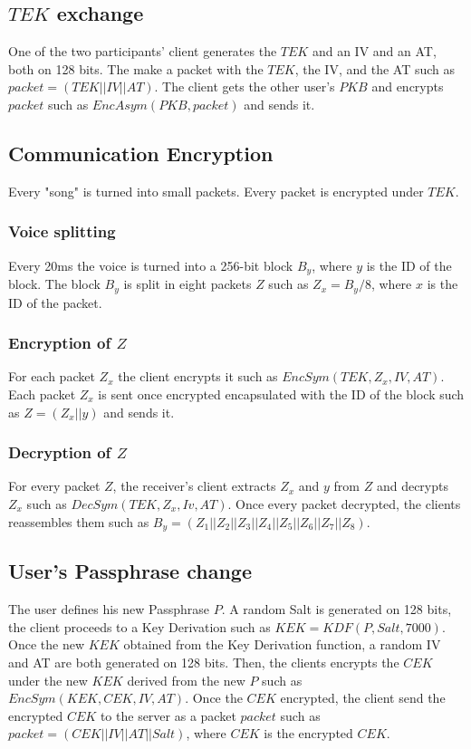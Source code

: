 \documentclass[a4paper,10pt]{article}
\begin{document}
\subsection{$TEK$ exchange}
One of the two participants' client generates the $TEK$ and an IV and an AT, both on 128 bits. The make a packet with the $TEK$, the IV, and the AT such as $packet=(TEK||IV||AT)$. The client gets the other user's $PKB$ and encrypts $packet$ such as $EncAsym(PKB,packet)$ and sends it.

\subsection{Communication Encryption}
Every "song" is turned into small packets. Every packet is encrypted under $TEK$.

\subsubsection{Voice splitting}
Every 20ms the voice is turned into a 256-bit block $B_y$, where $y$ is the ID of the block. The block $B_y$ is split in eight packets $Z$ such as $Z_x=B_y/8$, where $x$ is the ID of the packet. 

\subsubsection{Encryption of $Z$}
For each packet $Z_x$ the client encrypts it such as $EncSym(TEK,Z_x,IV,AT)$. Each packet $Z_x$ is sent once encrypted encapsulated with the ID of the block such as $Z=(Z_x||y)$ and sends it.

\subsubsection{Decryption of $Z$}
For every packet $Z$, the receiver's client extracts $Z_x$ and $y$ from $Z$ and decrypts $Z_x$ such as $DecSym(TEK,Z_x,Iv,AT)$. Once every packet decrypted, the clients reassembles them such as $B_y=(Z_1||Z_2||Z_3||Z_4||Z_5||Z_6||Z_7||Z_8)$.

\subsection{User's Passphrase change}
The user defines his new Passphrase $P$. A random Salt is generated on 128 bits, the client proceeds to a Key Derivation such as $KEK=KDF(P, Salt, 7000)$. Once the new $KEK$ obtained from the Key Derivation function, a random IV and AT are both generated on 128 bits. Then, the clients encrypts the $CEK$ under the new $KEK$ derived from the new $P$ such as $EncSym(KEK,CEK,IV,AT)$. Once the $CEK$ encrypted, the client send the encrypted $CEK$ to the server as a packet $packet$ such as $packet=(CEK||IV||AT||Salt)$, where $CEK$ is the encrypted $CEK$.
 
\end{document}
